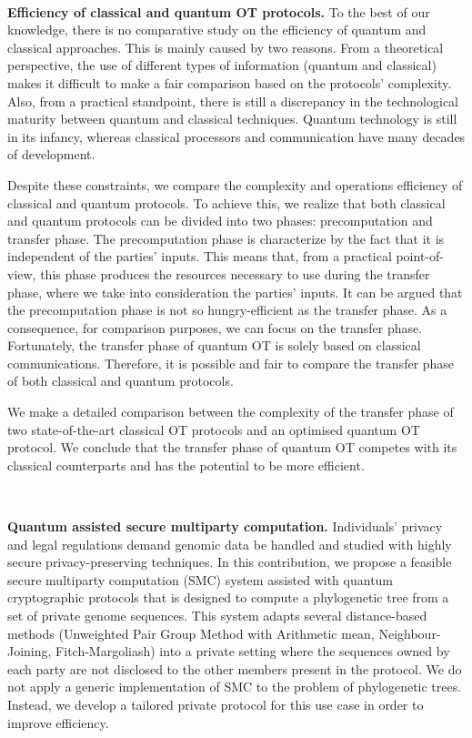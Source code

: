 \

\noindent\textbf{Efficiency of classical and quantum OT protocols.} To the best of our knowledge, there is no comparative study on the efficiency of quantum and classical approaches. This is mainly caused by two reasons. From a theoretical perspective, the use of different types of information (quantum and classical) makes it difficult to make a fair comparison based on the protocols' complexity. Also, from a practical standpoint, there is still a discrepancy in the technological maturity between quantum and classical techniques. Quantum technology is still in its infancy,  whereas classical processors and communication have many decades of development. 

Despite these constraints, we compare the complexity and operations efficiency of classical and quantum protocols. To achieve this, we realize that both classical and quantum protocols can be divided into two phases: precomputation and transfer phase. The precomputation phase is characterize by the fact that it is independent of the parties' inputs. This means that, from a practical point-of-view, this phase produces the resources necessary to use during the transfer phase, where we take into consideration the parties' inputs. It can be argued that the precomputation phase is not so hungry-efficient as the transfer phase. As a consequence, for comparison purposes, we can focus on the transfer phase. Fortunately, the transfer phase of quantum OT is solely based on classical communications. Therefore, it is possible and fair to compare the transfer phase of both classical and quantum protocols. 

We make a detailed comparison between the complexity of the transfer phase of two state-of-the-art classical OT protocols \cite{ALSZ13, KOS15} and an optimised quantum OT protocol. We conclude that the transfer phase of quantum OT competes with its classical counterparts and has the potential to be more efficient.

\

\noindent\textbf{Quantum assisted secure multiparty computation.} Individuals’ privacy and legal regulations demand genomic data be handled and studied with highly secure privacy-preserving techniques. In this contribution, we propose a feasible secure multiparty computation (SMC) system assisted with quantum cryptographic protocols that is designed to compute a phylogenetic tree from a set of private genome sequences. This system adapts several distance-based methods (Unweighted Pair Group Method with Arithmetic mean, Neighbour-Joining, Fitch-Margoliash) into a private setting where the sequences owned by each party are not disclosed to the other members present in the protocol. We do not apply a generic implementation of SMC to the problem of phylogenetic trees. Instead, we develop a tailored private protocol for this use case in order to improve efficiency. 

